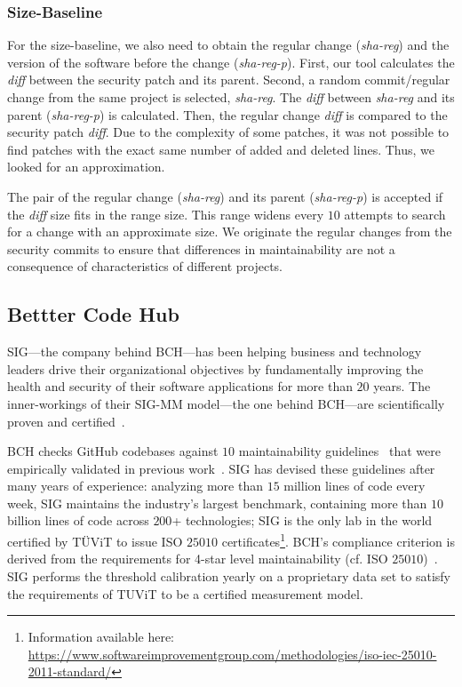 \documentclass[smallextended]{svjour3}       %
\begin{document}
\subsubsection{Size-Baseline} 

For the size-baseline, we also need to obtain the regular change (\emph{sha-reg})
and the version of the software before the change (\emph{sha-reg-p}). 
First, our tool calculates the \emph{diff}
between the security patch and its parent.
Second, a random commit/regular change from 
the same project is selected, \emph{sha-reg}. The 
\emph{diff} between \emph{sha-reg} and its parent (\emph{sha-reg-p})
is calculated. Then, the regular change \emph{diff} is compared 
to the security patch \emph{diff}.
Due to the complexity of some patches, it was not possible 
to find patches with the exact same number of added and deleted lines. 
Thus, we looked for an approximation.

The pair of the regular change (\emph{sha-reg}) and its parent (\emph{sha-reg-p}) is accepted if the 
\emph{diff} size fits in the range size. This range widens every 
$10$ attempts to search for a change with an approximate size. We 
originate the regular changes from the security commits to ensure 
that differences in maintainability are not a consequence of 
characteristics of different projects.


\subsection{Bettter Code Hub}

SIG---the company behind BCH---has been helping business and technology 
leaders drive their organizational objectives by fundamentally improving 
the health and security of their software applications for more than $20$ years. 
The inner-workings of their SIG-MM model---the one behind BCH---are 
scientifically proven and certified~\cite{4335232,5609747,6113040,baggen2012}.

BCH checks GitHub codebases against $10$ maintainability 
guidelines~\cite{Visser:2016:OREILLY} that were empirically 
validated in previous work~\cite{Bijlsma:2012:FIR:2317098.2317124,8530041,8919169,8785997}.
SIG has devised these guidelines after many years of experience: analyzing more 
than $15$ million lines of code every week, SIG maintains the industry’s largest 
benchmark, containing more than $10$ billion lines of code across $200$+ technologies; SIG 
is the only lab in the world certified by TÜViT to issue ISO $25010$ certificates\footnote{Information available here: 
\url{https://www.softwareimprovementgroup.com/methodologies/iso-iec-25010-2011-standard/}}.
BCH's compliance criterion is derived from the requirements for 4-star 
level maintainability (cf. ISO $25010$)~\cite{5609747,6113040,baggen2012,Visser:2016:OREILLY}.
SIG performs the threshold calibration
yearly on a proprietary data set to satisfy the requirements of TUViT to
be a certified measurement model.
\end{document}
